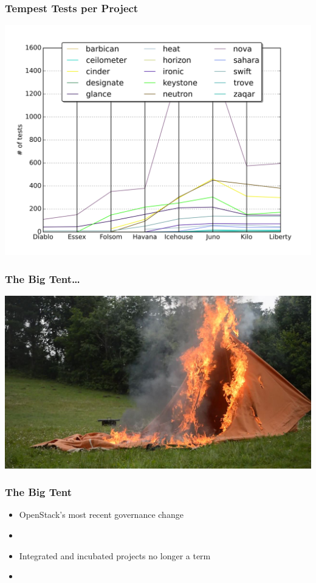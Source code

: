 \documentclass[aspectratio=169,11pt,hyperref={colorlinks=true}]{beamer}
\begin{document}
\begin{frame}
    \frametitle{Tempest Tests per Project}
    \begin{center}
        \includegraphics[width=.8\textwidth]{tests_per_proj.png}
    \end{center}
\end{frame}

\begin{frame}
    \frametitle{The Big Tent\ldots}
    \begin{center}
        \includegraphics[width=.9\textwidth]{Burning_Tent.jpg}
    \end{center}
\end{frame}

\begin{frame}
    \frametitle{The Big Tent}
    \begin{itemize}
        \item OpenStack's most recent governance change
        \item
        \item Integrated and incubated projects no longer a term
        \item 
    \end{itemize}
\end{frame}
\end{document}
